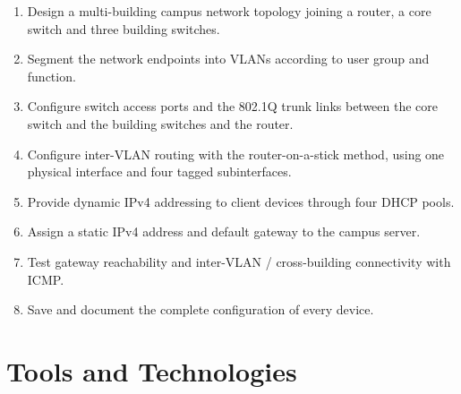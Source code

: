 \documentclass[11pt,a4paper]{article}
\begin{document}
\begin{enumerate}[label=\textbf{\arabic*.},leftmargin=2em]
  \item Design a multi-building campus network topology joining a router, a core
        switch and three building switches.
  \item Segment the network endpoints into VLANs according to user group and function.
  \item Configure switch access ports and the 802.1Q trunk links between the core switch
        and the building switches and the router.
  \item Configure inter-VLAN routing with the router-on-a-stick method, using one
        physical interface and four tagged subinterfaces.
  \item Provide dynamic IPv4 addressing to client devices through four DHCP pools.
  \item Assign a static IPv4 address and default gateway to the campus server.
  \item Test gateway reachability and inter-VLAN / cross-building connectivity with
        ICMP.
  \item Save and document the complete configuration of every device.
\end{enumerate}

\section{Tools and Technologies}
\end{document}

